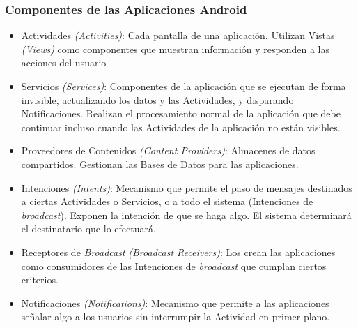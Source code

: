 \documentclass[hyperref={pdfpagelabels=true},ucs]{beamer}
\begin{document}
\begin{frame}[shrink=15]
\frametitle{Componentes de las Aplicaciones Android}

\begin{itemize}
\item \alert{Actividades \emph{(Activities)}}: Cada pantalla de una aplicación. Utilizan
  \alert{Vistas \emph{(Views)}} como componentes que muestran
  información y responden a las acciones del usuario
\item \alert{Servicios \emph{(Services)}}: Componentes de la
  aplicación que se ejecutan de forma invisible, actualizando los
  datos y las Actividades, y disparando Notificaciones. Realizan el
  procesamiento normal de la aplicación que debe continuar incluso
  cuando las Actividades de la aplicación no están visibles.
\item \alert{Proveedores de Contenidos \emph{(Content Providers)}}:
  Almacenes de datos compartidos. Gestionan las Bases de Datos para las
  aplicaciones.
\item \alert{Intenciones \emph{(Intents)}}: Mecanismo que permite el paso
  de mensajes destinados a ciertas Actividades o Servicios, o a todo
  el sistema (Intenciones de \emph{broadcast}). Exponen la intención de
  que se haga algo. El sistema determinará el destinatario que lo efectuará.
\item \alert{Receptores de \emph{Broadcast} \emph{(Broadcast
      Receivers)}}: Los crean las aplicaciones como consumidores de
  las Intenciones de \emph{broadcast} que cumplan ciertos criterios.
\item \alert{Notificaciones \emph{(Notifications)}}: Mecanismo que
  permite a las aplicaciones señalar algo a los usuarios sin
  interrumpir la Actividad en primer plano.
\end{itemize}

\end{frame}
\end{document}
